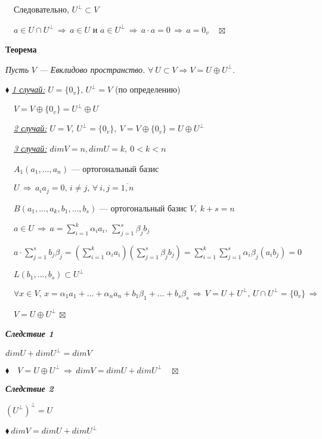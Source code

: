 \documentclass[a4paper, 12pt]{report}
\begin{document}
	$\quad$Следовательно, $ U^{\perp} \subset V$
	
	$\quad a \in U \cap U^{\perp} \, \Rightarrow \, a \in U$ и $a \in U^{\perp} \, \Rightarrow \, a \cdot a=0 \, \Rightarrow \, a=0_v \quad \boxtimes$
	\par \bigskip
	\textbf{Теорема}
	
	\textit{Пусть} $V$\textit{ --- Евклидово пространство. }$ \forall\ U \subset V \Rightarrow V= U \oplus U^{\perp}$.
	\par \bigskip
	$\blacklozenge$\textit{ \underline{1 случай:}} $U=\{0_v\}, \, U^{\perp}=V$ (по определению)
	
	$\quad V=V \oplus \{0_v\}=U^{\perp} \oplus U$
	
	$\quad$\textit{\underline{2 случай:}} $U=V, \, U^{\perp}=\{0_v\},\ V=V \oplus \{0_v\}=U \oplus U^{\perp}$
	
	$\quad$\textit{\underline{3 случай:}} $dim V=n, dim U=k,\ 0<k<n$
	
	$\quad A_1(a_1,...,a_n)$ --- ортогональный базис
	
	$\quad U \, \Rightarrow \, a_i a_j=0, \, i \ne j, \, \forall\  i,j=\overline{1,n}$
	
	$\quad B(a_1,...,a_k,b_1,...,b_s) $ --- ортогональный базис $V,\ k+s=n$
	
	$\quad a \in U \, \Rightarrow \, a=\sum_{i=1}^k \alpha_i a_i,\ \sum_{j=1}^s \beta_j b_j$
	
	$\quad a \cdot \sum_{j=1}^s b_j \beta_j=(\sum_{i=1}^k \alpha_i a_i)(\sum_{j=1}^s \beta_j b_j)=\sum_{i=1}^k \sum_{j=1}^s \alpha_i \beta_j (a_i b_j)=0$
	
	$\quad L(b_1,...,b_s) \subset U^{\perp}$
	
	$\quad \forall x \in V, \, x= \alpha_1 a_1+...+\alpha_n a_n+b_1 \beta_1+...+b_s \beta_s \, \Rightarrow \, V=U + U^{\perp}, \, U \cap U^{\perp}=\{0_v\} \, \Rightarrow \,$
	
	$\quad V=U \oplus U^{\perp} $ $\boxtimes$
	\par \bigskip
	\textit{\textbf{Следствие 1}}
	
	$dim U+dim U^{\perp}= dim V$
	\par \bigskip
	$\blacklozenge \quad V=U \oplus U^{\perp} \, \Rightarrow \, dim V=dimU+dimU^{\perp} \quad \boxtimes$
	\par \bigskip
	\textit{\textbf{Следствие 2}}
	
	$(U^{\perp})^{\perp}=U$
	\par \bigskip
	$\blacklozenge\ dim V=dim U+dim U^{\perp}$
	
\end{document}
